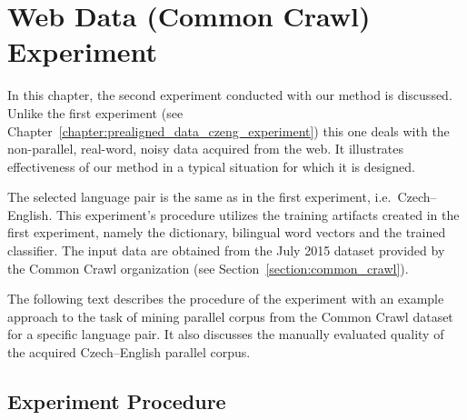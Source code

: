 
\chapter{Web Data (Common Crawl) Experiment}
\label{chapter:web_data_common_crawl_experiment}

In this chapter, the second experiment conducted with our method is discussed. Unlike the first experiment (see Chapter~\ref{chapter:prealigned_data_czeng_experiment}) this one deals with the non-parallel, real-word, noisy data acquired from the web. It illustrates effectiveness of our method in a typical situation for which it is designed.

The selected language pair is the same as in the first experiment, i.e.\ Czech--English. This experiment's procedure utilizes the training artifacts created in the first experiment, namely the dictionary, bilingual word vectors and the trained classifier. The input data are obtained from the July 2015 dataset provided by the Common Crawl organization (see Section~\ref{section:common_crawl}).

The following text describes the procedure of the experiment with an example approach to the task of mining parallel corpus from the Common Crawl dataset for a specific language pair. It also discusses the manually evaluated quality of the acquired Czech--English parallel corpus.

\section{Experiment Procedure}
\label{section:common_crawl_experiment_procedure}


